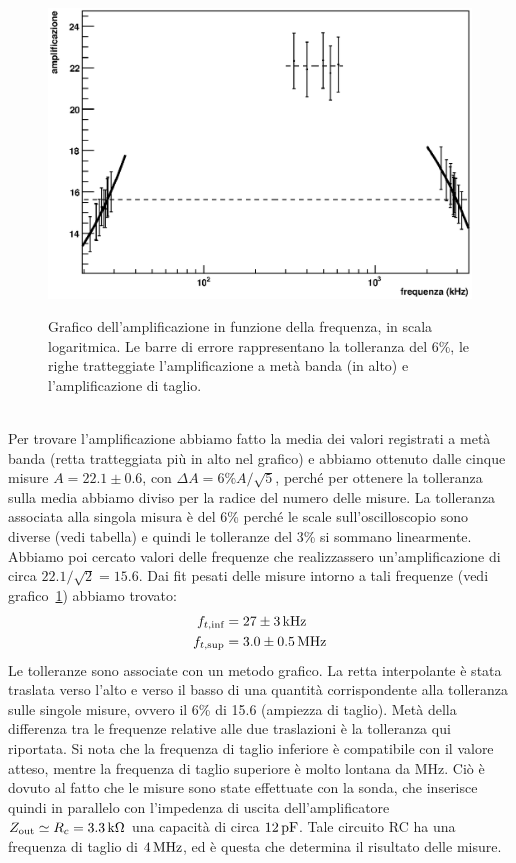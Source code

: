 \documentclass[italian,a4paper]{article}
\begin{document}
\begin{figure}[h]\caption{Grafico dell'amplificazione in funzione della
    frequenza, in scala logaritmica. Le barre di errore rappresentano la
    tolleranza del 6\%, le righe tratteggiate l'amplificazione a metà
    banda (in alto) e l'amplificazione di taglio.}
        \centering                                     
        \includegraphics[width=\textwidth]{amplificazione.eps}
    \label{fig:amplificazione}
\end{figure}\\
Per trovare l'amplificazione abbiamo fatto la media dei valori registrati a
metà banda (retta tratteggiata più in alto nel grafico) e abbiamo ottenuto
dalle cinque misure
$A = 22.1 \pm 0.6$, con $\Delta A = 6\%A / \sqrt{5}$, perch\'e per ottenere
la tolleranza sulla media abbiamo diviso per la radice del numero delle
misure. La tolleranza
associata alla singola misura è del 6\% perch\'e le scale
sull'oscilloscopio sono diverse (vedi tabella) e quindi le tolleranze
del 3\% si
sommano linearmente. Abbiamo poi cercato
valori delle frequenze che realizzassero un'amplificazione di circa
$22.1/\sqrt{2} = 15.6$. Dai fit pesati delle misure intorno a tali frequenze
(vedi grafico~\ref{fig:amplificazione}) abbiamo trovato:
\begin{align*}
    f_{t,\text{inf}} &= \unit[27 \pm 3]{kHz}\\
    f_{t,\text{sup}} &= \unit[3.0 \pm 0.5]{MHz}\\
\end{align*}
Le tolleranze sono associate con un metodo grafico. La retta interpolante è
stata traslata verso l'alto e verso il basso di una quantità corrispondente
alla tolleranza sulle singole misure, ovvero il 6\% di 15.6 (ampiezza di
taglio). Metà della differenza tra le frequenze relative alle due
traslazioni è la tolleranza qui riportata.
Si nota che la frequenza di taglio inferiore è compatibile con il valore
atteso, mentre la frequenza di taglio superiore è molto lontana da
\unit[7]{MHz}. Ciò è dovuto al fatto che le misure sono state effettuate
con la sonda, che inserisce quindi in parallelo con l'impedenza di
uscita dell'amplificatore $Z_{\text{out}} \simeq R_c =
\unit[3.3]{k\ohm}$ una capacità di
circa $\unit[12]{pF}$. Tale circuito RC ha una frequenza di taglio di
$\unit[4]{MHz}$, ed è questa che determina il risultato delle misure. 
\end{document}
